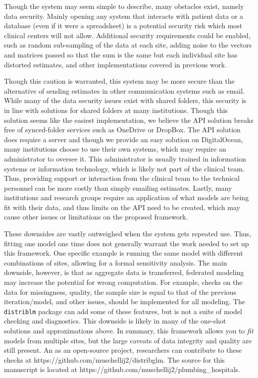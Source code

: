 \documentclass[]{elsarticle} %
\begin{document}
Though the system may seem simple to describe, many obstacles exist, namely data security. Mainly opening any system that interacts with patient data or a database (even if it were a spreadsheet) is a potential security risk which most clinical centers will not allow. Additional security requirements could be enabled, such as random sub-sampling of the data at each site, adding noise to the vectors and matrices passed so that the sum is the same but each individual site has distorted estimates, and other implementations covered in previous work.

Though this caution is warranted, this system may be more secure than the alternative of sending estimates in other communication systems such as email. While many of the data security issues exist with shared folders, this security is in line with solutions for shared folders at many institutions. Though this solution seems like the easiest implementation, we believe the API solution breaks free of synced-folder services such as OneDrive or DropBox. The API solution does require a server and though we provide an easy solution on DigitalOcean, many institutions choose to use their own systems, which may require an administrator to oversee it. This administrator is usually trained in information systems or information technology, which is likely not part of the clinical team. Thus, providing support or interaction from the clinical team to the technical personnel can be more costly than simply emailing estimates. Lastly, many institutions and research groups require an application of what models are being fit with their data, and thus limits on the API need to be created, which may cause other issues or limitations on the proposed framework.

These downsides are vastly outweighed when the system gets repeated use. Thus, fitting one model one time does not generally warrant the work needed to set up this framework. One specific example is running the same model with different combinations of sites, allowing for a formal sensitivity analysis. The main downside, however, is that as aggregate data is transferred, federated modeling may increase the potential for wrong computation. For example, checks on the data for missingness, quality, the sample size is equal to that of the previous iteration/model, and other issues, should be implemented for all modeling. The \texttt{distriblm} package can add some of these features, but is not a suite of model checking and diagnostics. This downside is likely in many of the one-shot solutions and approximations above. In summary, this framework allows you to \emph{fit} models from multiple sites, but the large caveats of data integrity and quality are still present. An as an open-source project, researchers can contribute to these checks at https://github.com/muschellij2/distribglm. The source for this manuscript is located at https://github.com/muschellij2/plumbing\_hospitals.
\end{document}
